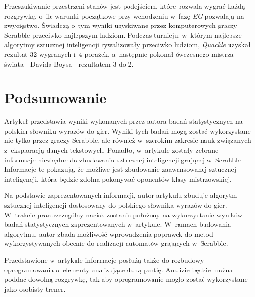 \documentclass[a4paper,twocolumn,12pt]{article}
\begin{document}
Przeszukiwanie przestrzeni stanów jest podejściem, które pozwala wygrać każdą rozgrywkę, o~ile warunki początkowe przy wchodzeniu w~fazę \emph{EG} pozwalają na zwycięstwo. Świadczą o~tym wyniki uzyskiwane przez komputerowych graczy Scrabble przeciwko najlepszym ludziom. Podczas turnieju, w~którym najlepsze algorytmy sztucznej inteligencji rywalizowały przeciwko ludziom, \emph{Quackle} uzyskał rezultat 32 wygranych i~4 porażek, a~następnie pokonał ówczesnego mistrza świata - Davida Boysa - rezultatem 3 do 2. \cite{intelligent_game_playing}

\section*{Podsumowanie}

Artykuł przedstawia wyniki wykonanych przez autora badań statystycznych na polskim słowniku wyrazów do gier. Wyniki tych badań mogą zostać wykorzystane nie tylko przez graczy Scrabble, ale również w~szerokim zakresie nauk związanych z~eksploracją danych tekstowych. Ponadto, w~artykule zostały zebrane informacje niezbędne do zbudowania sztucznej inteligencji grającej w~Scrabble. Informacje te pokazują, że możliwe jest zbudowanie zaawansowanej sztucznej inteligencji, która będzie zdolna pokonywać oponentów klasy mistrzowskiej.

Na podstawie zaprezentowanych informacji, autor artykułu zbuduje algorytm sztucznej inteligencji dostosowany do polskiego słownika wyrazów do gier. W~trakcie prac szczególny nacisk zostanie położony na wykorzystanie wyników badań statystycznych zaprezentowanych w~artykule. W~ramach budowania algorytmu, autor zbada możliwość wprowadzenia poprawek do metod wykorzystywanych obecnie do realizacji automatów grających w~Scrabble. 

Przedstawione w~artykule informacje posłużą także do rozbudowy oprogramowania o~elementy analizujące daną partię. Analizie będzie można poddać dowolną rozgrywkę, tak aby oprogramowanie mogło zostać wykorzystane jako osobisty trener. 
\end{document}
